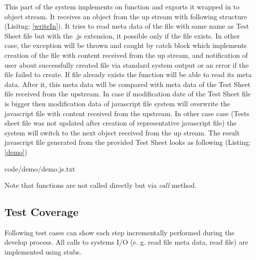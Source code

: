 This part of the system implements on function and exports it wrapped in to object stream. It receives an object from the up stream with following structure (Lisitng: \ref{writeIn}). It tries to read meta data of the file with same name as Test Sheet file but with the .js extension, it possible only if the file exists. In other case, the exception will be thrown and caught by catch block which implements creation of the file with content received from the up stream, and notification of user about successfully created file via standard system output or an error if the file failed to create. If file already exists the function will be able to read its meta data. After it, this meta data will be compared with meta data of the Test Sheet file received from the upstream. In case if modification date of the Test Sheet file is bigger then modification data of javascript file system will overwrite the javascript file with content received from the upstream. In other case case (Tests sheet file was not updated after creation of representative javascript file) the system will switch to the next object received from the up stream. The result javascript file generated from the provided Test Sheet looks as following (Listing: \ref{demo})


{code/demo/demo.js.txt}

Note that functions are not called directly but via \textit{call} method.

%

\subsection{Test Coverage}
Following test cases can show each step incrementally performed during the develop process. All calls to systems I/O (e. g. read file meta data, read file) are implemented using stubs.
%


